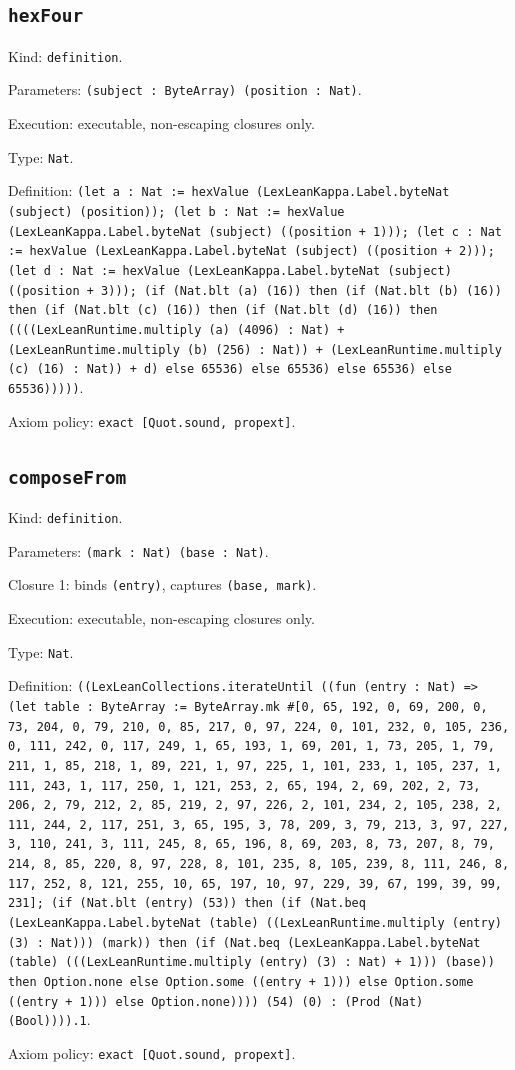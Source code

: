 \documentclass[11pt]{article}
\begin{document}
\subsection*{\texttt{hexFour}}
\noindent Kind: \texttt{definition}.\par
\noindent Parameters: \texttt{(subject : ByteArray) (position : Nat)}.\par
\noindent Execution: executable, non-escaping closures only.\par
\noindent Type: \texttt{Nat}.\par
\noindent Definition: \texttt{(let a : Nat := hexValue (LexLeanKappa.Label.byteNat (subject) (position)); (let b : Nat := hexValue (LexLeanKappa.Label.byteNat (subject) ((position + 1))); (let c : Nat := hexValue (LexLeanKappa.Label.byteNat (subject) ((position + 2))); (let d : Nat := hexValue (LexLeanKappa.Label.byteNat (subject) ((position + 3))); (if (Nat.blt (a) (16)) then (if (Nat.blt (b) (16)) then (if (Nat.blt (c) (16)) then (if (Nat.blt (d) (16)) then ((((LexLeanRuntime.multiply (a) (4096) : Nat) + (LexLeanRuntime.multiply (b) (256) : Nat)) + (LexLeanRuntime.multiply (c) (16) : Nat)) + d) else 65536) else 65536) else 65536) else 65536)))))}.\par
\noindent Axiom policy: \texttt{exact [Quot.sound, propext]}.\par
\subsection*{\texttt{composeFrom}}
\noindent Kind: \texttt{definition}.\par
\noindent Parameters: \texttt{(mark : Nat) (base : Nat)}.\par
\noindent Closure 1: binds \texttt{(entry)}, captures \texttt{(base, mark)}.\par
\noindent Execution: executable, non-escaping closures only.\par
\noindent Type: \texttt{Nat}.\par
\noindent Definition: \texttt{((LexLeanCollections.iterateUntil ((fun (entry : Nat) => (let table : ByteArray := ByteArray.mk \#[0, 65, 192, 0, 69, 200, 0, 73, 204, 0, 79, 210, 0, 85, 217, 0, 97, 224, 0, 101, 232, 0, 105, 236, 0, 111, 242, 0, 117, 249, 1, 65, 193, 1, 69, 201, 1, 73, 205, 1, 79, 211, 1, 85, 218, 1, 89, 221, 1, 97, 225, 1, 101, 233, 1, 105, 237, 1, 111, 243, 1, 117, 250, 1, 121, 253, 2, 65, 194, 2, 69, 202, 2, 73, 206, 2, 79, 212, 2, 85, 219, 2, 97, 226, 2, 101, 234, 2, 105, 238, 2, 111, 244, 2, 117, 251, 3, 65, 195, 3, 78, 209, 3, 79, 213, 3, 97, 227, 3, 110, 241, 3, 111, 245, 8, 65, 196, 8, 69, 203, 8, 73, 207, 8, 79, 214, 8, 85, 220, 8, 97, 228, 8, 101, 235, 8, 105, 239, 8, 111, 246, 8, 117, 252, 8, 121, 255, 10, 65, 197, 10, 97, 229, 39, 67, 199, 39, 99, 231]; (if (Nat.blt (entry) (53)) then (if (Nat.beq (LexLeanKappa.Label.byteNat (table) ((LexLeanRuntime.multiply (entry) (3) : Nat))) (mark)) then (if (Nat.beq (LexLeanKappa.Label.byteNat (table) (((LexLeanRuntime.multiply (entry) (3) : Nat) + 1))) (base)) then Option.none else Option.some ((entry + 1))) else Option.some ((entry + 1))) else Option.none)))) (54) (0) : (Prod (Nat) (Bool)))).1}.\par
\noindent Axiom policy: \texttt{exact [Quot.sound, propext]}.\par
\end{document}
